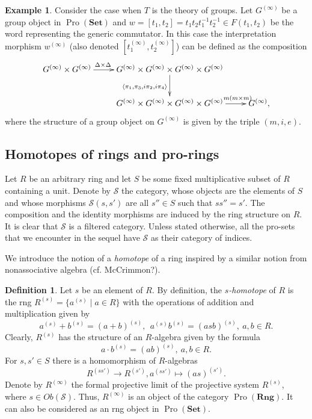 \documentclass{article}
\theoremstyle{definition}
\newtheorem{df}[lemma]{Definition} \Crefname{df}{Definition}{Definitions}
\newtheorem{example}[lemma]{Example} \Crefname{example}{Example}{Examples}
\theoremstyle{remark}
\DeclareMathOperator{\Pro}{Pro}
\newcommand{\Set}{\mathbf{Set}}
\newcommand{\Rng}{\mathbf{Rng}}
\begin{document}
\begin{example}\label{example-commutator}
Consider the case when $T$ is the theory of groups.
Let $G^{(\infty)}$ be a group object in $\Pro(\Set)$ and $w = [t_1, t_2] = t_1 t_2 t_1^{-1} t_2^{-1} \in F(t_1, t_2)$ be the word representing the generic commutator.
In this case the interpretation morphism $w^{(\infty)}$ (also denoted $[t_1^{(\infty)}, t_2^{(\infty)}]$) can be defined as the composition
 \[ \xymatrix{G^{(\infty)} \times G^{(\infty)} \ar[r]^(.35){\Delta \times \Delta} & G^{(\infty)} \times G^{(\infty)} \times G^{(\infty)} \times G^{(\infty)} \ar[d]_{\langle \pi_1, \pi_3, i\pi_2, i\pi_4 \rangle} & \\
    & G^{(\infty)} \times G^{(\infty)} \times G^{(\infty)} \times G^{(\infty)} \ar[r]^(.76){m(m\times m)} & G^{(\infty)},} \]
where the structure of a group object on $G^{(\infty)}$ is given by the triple $(m, i, e)$.
\end{example}

\subsection{Homotopes of rings and pro-rings}
Let $R$ be an arbitrary ring and let \(S\) be some fixed multiplicative subset of $R$ containing a unit. Denote by $\mathcal{S}$ the category, whose objects are the elements of \(S\) and whose morphisms \(\mathcal{S}(s, s')\) are all \(s'' \in S\) such that \(ss'' = s'\). The composition and the identity morphisms are induced by the ring structure on $R$. It is clear that $\mathcal{S}$ is a filtered category. Unless stated otherwise, all the pro-sets that we encounter in the sequel have \(\mathcal S\) as their category of indices.

We introduce the notion of a {\it homotope} of a ring inspired by a similar notion from nonassociative algebra (cf. McCrimmon?). 
\begin{df} \label{ring-homotope}
 Let $s$ be an element of $R$.  
 By definition, the {\it \(s\)-homotope} of \(R\) is the rng \(R^{(s)} = \{a^{(s)} \mid a \in R\}\) with the operations of addition and multiplication given by
 \[ a^{(s)} + b^{(s)} = (a + b)^{(s)},\ \ a^{(s)} b^{(s)} = (asb)^{(s)},\ a, b\in R.\]
 Clearly, $R^{(s)}$ has the structure of an \(R\)-algebra given by the formula \[a \cdot b^{(s)} = (ab)^{(s)},\ a, b \in R.\] For \(s, s' \in S\) there is a homomorphism of \(R\)-algebras \[R^{(ss')} \to R^{(s')}, a^{(ss')} \mapsto (as)^{(s')}.\]
 Denote by \(R^{(\infty)}\) the formal projective limit of the projective system \(R^{(s)}\), where \(s \in Ob(\mathcal S)\).
 Thus, $R^{(\infty)}$ is an object of the category $\Pro(\Rng)$. 
 It can also be considered as an rng object in \(\Pro(\Set)\).  
\end{df}
\end{document}
